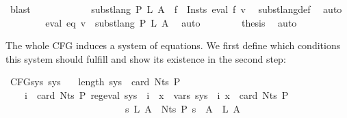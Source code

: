 \begin{isabellebody}
\ blast\isanewline
\ \ \ \ \isamarkupfalse%
\isanewline
\ \ \ \ \isamarkupfalse%
\ \isamarkupfalse%
\ {\isachardoublequoteopen}subst{\isacharunderscore}{\kern0pt}lang\ P\ L\ A\ {\isacharequal}{\kern0pt}\ {\isacharparenleft}{\kern0pt}{\isasymUnion}f\ {\isasymin}\ {\isacharquery}{\kern0pt}Insts{\isachardot}{\kern0pt}\ eval\ f\ v{\isacharparenright}{\kern0pt}{\isachardoublequoteclose}\ \isamarkupfalse%
\ subst{\isacharunderscore}{\kern0pt}lang{\isacharunderscore}{\kern0pt}def\ \isamarkupfalse%
\ auto\isanewline
\ \ \ \ \isamarkupfalse%
\ {\isacharasterisk}{\kern0pt}\ \isamarkupfalse%
\ {\isachardoublequoteopen}eval\ eq\ v\ {\isacharequal}{\kern0pt}\ subst{\isacharunderscore}{\kern0pt}lang\ P\ L\ A{\isachardoublequoteclose}\ \isamarkupfalse%
\ auto\isanewline
\ \ \isamarkupfalse%
\isanewline
\ \ \isamarkupfalse%
\ \isamarkupfalse%
\ {\isacharquery}{\kern0pt}thesis\ \isamarkupfalse%
\ auto\isanewline
{}\isamarkupfalse%
%
\endisatagproof
{\isafoldproof}%
%
\isadelimproof
%
\endisadelimproof
%
\begin{isamarkuptext}%
The whole CFG induces a system of  equations. We first define which conditions
this system should fulfill and show its existence in the second step:%
\end{isamarkuptext}\isamarkuptrue%
\isamarkupfalse%
\ {\isachardoublequoteopen}CFG{\isacharunderscore}{\kern0pt}sys\ sys\ {\isasymequiv}\isanewline
\ \ length\ sys\ {\isacharequal}{\kern0pt}\ card\ {\isacharparenleft}{\kern0pt}Nts\ P{\isacharparenright}{\kern0pt}\ {\isasymand}\isanewline
\ \ \ \ {\isacharparenleft}{\kern0pt}{\isasymforall}i\ {\isacharless}{\kern0pt}\ card\ {\isacharparenleft}{\kern0pt}Nts\ P{\isacharparenright}{\kern0pt}{\isachardot}{\kern0pt}\ reg{\isacharunderscore}{\kern0pt}eval\ {\isacharparenleft}{\kern0pt}sys\ {\isacharbang}{\kern0pt}\ i{\isacharparenright}{\kern0pt}\ {\isasymand}\ {\isacharparenleft}{\kern0pt}{\isasymforall}x\ {\isasymin}\ vars\ {\isacharparenleft}{\kern0pt}sys\ {\isacharbang}{\kern0pt}\ i{\isacharparenright}{\kern0pt}{\isachardot}{\kern0pt}\ x\ {\isacharless}{\kern0pt}\ card\ {\isacharparenleft}{\kern0pt}Nts\ P{\isacharparenright}{\kern0pt}{\isacharparenright}{\kern0pt}\isanewline
\ \ \ \ \ \ \ \ \ \ \ \ \ \ \ \ \ \ \ \ \ \ \ \ {\isasymand}\ {\isacharparenleft}{\kern0pt}{\isasymforall}s\ L{\isachardot}{\kern0pt}\ {\isacharparenleft}{\kern0pt}{\isasymforall}A\ {\isasymin}\ Nts\ P{\isachardot}{\kern0pt}\ s\ {\isacharparenleft}{\kern0pt}{\isasymgamma}{\isacharprime}{\kern0pt}\ A{\isacharparenright}{\kern0pt}\ {\isacharequal}{\kern0pt}\ L\ A{\isacharparenright}{\kern0pt}\isanewline

\end{isabellebody}

